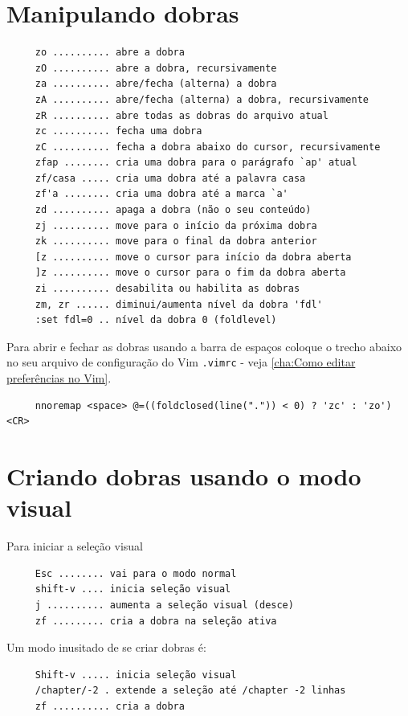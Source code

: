 \documentclass[10pt,a4paper,openany]{book}
\begin{document}
\section{Manipulando dobras }\label{Manipulando dobras }

\begin{verbatim}
     zo .......... abre a dobra
     zO .......... abre a dobra, recursivamente
     za .......... abre/fecha (alterna) a dobra
     zA .......... abre/fecha (alterna) a dobra, recursivamente
     zR .......... abre todas as dobras do arquivo atual
     zc .......... fecha uma dobra
     zC .......... fecha a dobra abaixo do cursor, recursivamente
     zfap ........ cria uma dobra para o parágrafo `ap' atual
     zf/casa ..... cria uma dobra até a palavra casa
     zf'a ........ cria uma dobra até a marca `a'
     zd .......... apaga a dobra (não o seu conteúdo)
     zj .......... move para o início da próxima dobra
     zk .......... move para o final da dobra anterior
     [z .......... move o cursor para início da dobra aberta
     ]z .......... move o cursor para o fim da dobra aberta
     zi .......... desabilita ou habilita as dobras
     zm, zr ...... diminui/aumenta nível da dobra 'fdl'
     :set fdl=0 .. nível da dobra 0 (foldlevel)
\end{verbatim}

Para abrir e fechar as dobras usando a barra de
espaços coloque o trecho abaixo no seu arquivo de configuração do Vim
\verb|.vimrc| - veja \ref{cha:Como editar preferências no Vim}.

\begin{verbatim}
     nnoremap <space> @=((foldclosed(line(".")) < 0) ? 'zc' : 'zo')<CR>
\end{verbatim}

\section{Criando dobras usando o modo visual}
\label{Criando folders usando o modo visual}
Para iniciar a seleção visual

\begin{verbatim}
     Esc ........ vai para o modo normal
     shift-v .... inicia seleção visual
     j .......... aumenta a seleção visual (desce)
     zf ......... cria a dobra na seleção ativa
\end{verbatim}

Um modo inusitado de se criar dobras é:

\begin{verbatim}
     Shift-v ..... inicia seleção visual
     /chapter/-2 . extende a seleção até /chapter -2 linhas
     zf .......... cria a dobra
\end{verbatim}
\end{document}
